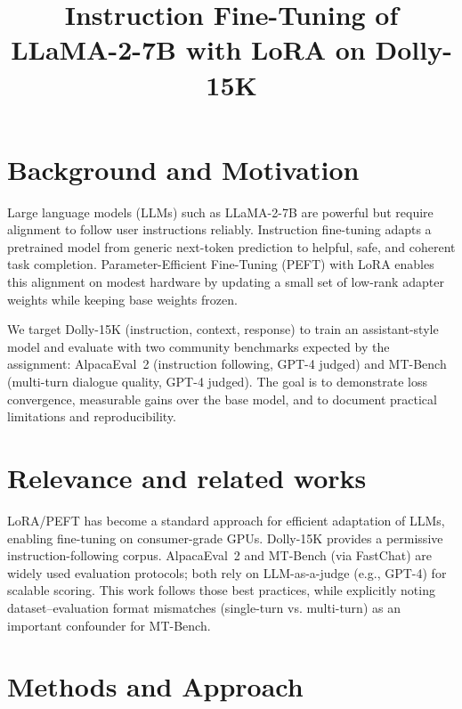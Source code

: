 \documentclass{assignment7_report}
\title{Instruction Fine-Tuning of LLaMA-2-7B with LoRA on Dolly-15K}
\author{\coord{Nauman}{(Author)}{1}}
\begin{document}
\maketitle

\section{Background and Motivation}
\vspace*{-3mm}

Large language models (LLMs) such as LLaMA-2-7B are powerful but require alignment to follow user instructions reliably. Instruction fine-tuning adapts a pretrained model from generic next-token prediction to helpful, safe, and coherent task completion. Parameter-Efficient Fine-Tuning (PEFT) with LoRA enables this alignment on modest hardware by updating a small set of low-rank adapter weights while keeping base weights frozen.

We target Dolly-15K (instruction, context, response) to train an assistant-style model and evaluate with two community benchmarks expected by the assignment: AlpacaEval~2 (instruction following, GPT-4 judged) and MT-Bench (multi-turn dialogue quality, GPT-4 judged). The goal is to demonstrate loss convergence, measurable gains over the base model, and to document practical limitations and reproducibility. 

\section{Relevance and related works}
\vspace*{-3mm}

LoRA/PEFT has become a standard approach for efficient adaptation of LLMs, enabling fine-tuning on consumer-grade GPUs. Dolly-15K provides a permissive instruction-following corpus. AlpacaEval~2 and MT-Bench (via FastChat) are widely used evaluation protocols; both rely on LLM-as-a-judge (e.g., GPT-4) for scalable scoring. This work follows those best practices, while explicitly noting dataset--evaluation format mismatches (single-turn vs. multi-turn) as an important confounder for MT-Bench.


\section{Methods and Approach}
\vspace*{-3mm}
\end{document}
